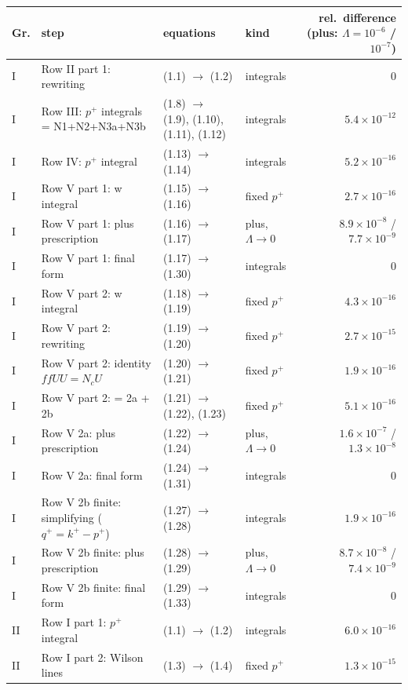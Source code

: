 \documentclass[10pt]{article}
\begin{document}
{\footnotesize
\begin{longtable}{@{}l>{\raggedright\arraybackslash}p{5.6cm}>{\raggedright\arraybackslash}p{4.0cm}lr@{}}
\toprule
Gr. & step & equations & kind & rel.\ difference (plus: $\Lambda=10^{-6}$ / $10^{-7}$)\\\midrule
\endhead
I & Row II part 1: rewriting & (1.1) $\to$ (1.2) & integrals & $0$\\
I & Row III: $p^+$ integrals = N1+N2+N3a+N3b & (1.8) $\to$ (1.9), (1.10), (1.11), (1.12) & integrals & $5.4\times10^{-12}$\\
I & Row IV: $p^+$ integral & (1.13) $\to$ (1.14) & integrals & $5.2\times10^{-16}$\\
I & Row V part 1: w integral & (1.15) $\to$ (1.16) & fixed $p^+$ & $2.7\times10^{-16}$\\
I & Row V part 1: plus prescription & (1.16) $\to$ (1.17) & plus, $\Lambda\to0$ & $8.9\times10^{-8}$ / $7.7\times10^{-9}$\\
I & Row V part 1: final form & (1.17) $\to$ (1.30) & integrals & $0$\\
I & Row V part 2: w integral & (1.18) $\to$ (1.19) & fixed $p^+$ & $4.3\times10^{-16}$\\
I & Row V part 2: rewriting & (1.19) $\to$ (1.20) & fixed $p^+$ & $2.7\times10^{-15}$\\
I & Row V part 2: identity $ffUU=N_cU$ & (1.20) $\to$ (1.21) & fixed $p^+$ & $1.9\times10^{-16}$\\
I & Row V part 2: = 2a + 2b & (1.21) $\to$ (1.22), (1.23) & fixed $p^+$ & $5.1\times10^{-16}$\\
I & Row V 2a: plus prescription & (1.22) $\to$ (1.24) & plus, $\Lambda\to0$ & $1.6\times10^{-7}$ / $1.3\times10^{-8}$\\
I & Row V 2a: final form & (1.24) $\to$ (1.31) & integrals & $0$\\
I & Row V 2b finite: simplifying ($q^+=k^+-p^+$) & (1.27) $\to$ (1.28) & integrals & $1.9\times10^{-16}$\\
I & Row V 2b finite: plus prescription & (1.28) $\to$ (1.29) & plus, $\Lambda\to0$ & $8.7\times10^{-8}$ / $7.4\times10^{-9}$\\
I & Row V 2b finite: final form & (1.29) $\to$ (1.33) & integrals & $0$\\
II & Row I part 1: $p^+$ integral & (1.1) $\to$ (1.2) & integrals & $6.0\times10^{-16}$\\
II & Row I part 2: Wilson lines & (1.3) $\to$ (1.4) & fixed $p^+$ & $1.3\times10^{-15}$\\

\end{longtable}}
\end{document}
